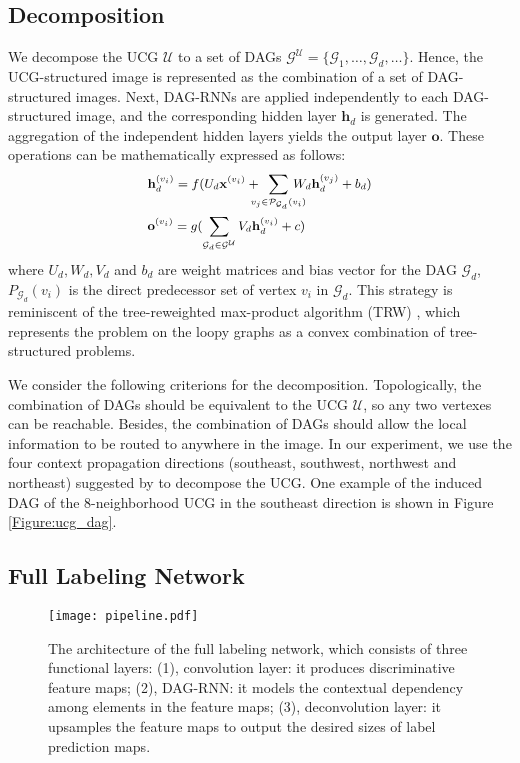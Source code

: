 \documentclass[10pt,twocolumn,letterpaper]{article}
\newcommand \hh {\mathbf{h}}
\newcommand \oo {\mathbf{o}}
\newcommand \xx {\mathbf{x}}
\begin{document}
\subsection{Decomposition}
We decompose the UCG $\mathcal{U}$ to a set of DAGs $\mathcal{G}^{\mathcal{U}}=\{\mathcal{G}_1, \ldots, \mathcal{G}_d, \ldots \}$. Hence, the UCG-structured image is represented as the combination of a set of DAG-structured images.
Next, DAG-RNNs are applied independently to each DAG-structured image, and the corresponding hidden layer $\hh_d$ is generated.
The aggregation of the independent hidden layers yields the output layer $\oo$. These operations can be mathematically expressed as follows:
\begin{equation}
\small
\begin{aligned}
&\hh_{d}^{(v_i)} = f(U_d \xx^{(v_i)} + \!\!\!\!\! \sum_{v_j \in \mathcal{P}_{\mathcal{G}_d}(v_i)} \!\!\!\!\!\!\! W_d \hh_{d}^{(v_j)} + b_d) \\
&\oo^{(v_i)} = g(\sum_{\mathcal{G}_d \in \mathcal{G}^{\mathcal{U}} } V_d \hh_{d}^{(v_i)} + c)\\
\end{aligned}
\label{Equation:quad_dag_rnn}
\end{equation}
where $U_d, W_d, V_d$ and $b_d$ are weight matrices and bias vector for the DAG $\mathcal{G}_d$, $P_{\mathcal{G}_d}(v_i)$ is the direct predecessor set of vertex $v_i$ in $\mathcal{G}_{d}$.
This strategy is reminiscent of the tree-reweighted max-product algorithm (TRW) \cite{wainwright2005new}, which represents the problem on the loopy graphs as a convex combination of tree-structured problems.

We consider the following criterions for the decomposition.  Topologically, the combination of DAGs should be equivalent to the UCG $\mathcal{U}$, so any two vertexes can be reachable. Besides, the combination of DAGs should allow the local information to be routed to anywhere in the image.
In our experiment, we use the four context propagation directions (southeast, southwest, northwest and northeast) suggested by \cite{graves2012offline}\cite{shuai2015quaddirectional} to decompose the UCG.
One example of the induced DAG of the 8-neighborhood UCG in the southeast direction is shown in Figure \ref{Figure:ucg_dag}.




\subsection{Full Labeling Network}
\begin{figure}[t]
\begin{center}
  \texttt{[image: pipeline.pdf]}
\end{center}
\caption{The architecture of the full labeling network, which consists of three functional layers: (1), convolution layer: it produces discriminative feature maps; (2), DAG-RNN: it models the contextual dependency among elements in the feature maps; (3), deconvolution layer: it upsamples the feature maps to output the desired sizes of label prediction maps.}
\label{Figure:pipeline}
\end{figure}
\end{document}
